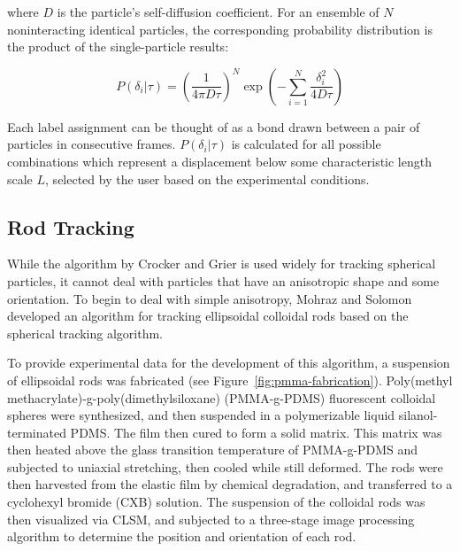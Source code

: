where $D$ is the particle's self-diffusion coefficient.  For an ensemble of $N$ noninteracting
identical particles, the corresponding probability distribution is the product of the 
single-particle results:

\begin{center}\begin{equation}P({\delta_i}|\tau) = \left( \frac{1}{4\pi D\tau} \right)^N 
\exp{ \left( -\sum_{i=1}^N \frac{\delta_i^2}{4D\tau} \right) }
\end{equation}\end{center}

Each label assignment can be thought of as a bond drawn between a pair of particles
in consecutive frames.  $P({\delta_i}|\tau)$ is calculated for all possible combinations which
represent a displacement below some characteristic length scale $L$, selected by the user based on
the experimental conditions.

\subsection{Rod Tracking}

While the algorithm by Crocker and Grier is used widely for tracking spherical particles, it 
cannot deal with particles that have an anisotropic shape and some orientation. 
To begin to deal with simple anisotropy, Mohraz and Solomon developed an algorithm for tracking 
ellipsoidal colloidal rods based on the spherical tracking algorithm.~\cite{rods-mohraz, solomon-dynamics}


To provide experimental data for the development of this algorithm, a suspension of 
ellipsoidal rods was fabricated (see Figure~\ref{fig:pmma-fabrication}).
Poly(methyl methacrylate)-g-poly(dimethylsiloxane) (PMMA-g-PDMS) fluorescent colloidal spheres were
synthesized, and then suspended in a polymerizable liquid silanol-terminated PDMS.
The film then cured to form a solid 
matrix.  This matrix was then heated above the glass transition temperature 
of PMMA-g-PDMS and subjected to 
uniaxial stretching, then cooled while still deformed.  The rods were then harvested from the 
elastic film by chemical degradation, and transferred to a cyclohexyl bromide (CXB) solution.
The suspension of the colloidal rods was then visualized via CLSM, and 
subjected to a three-stage image processing algorithm to determine the position and orientation of each rod.

